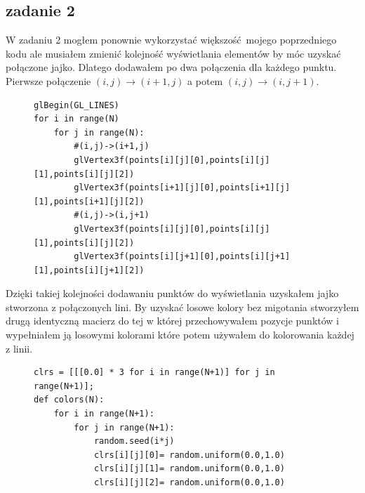 \documentclass[]{article}
\begin{document}
\subsection{zadanie 2}
W zadaniu 2 mogłem ponownie wykorzystać większość mojego poprzedniego kodu ale musiałem zmienić kolejność wyświetlania elementów by móc uzyskać połączone jajko. Dlatego dodawałem po dwa połączenia dla każdego punktu. Pierwsze połączenie $(i,j)\rightarrow (i+1,j)$ a potem $(i,j) \rightarrow (i,j+1)$.
\begin{figure}[H]
	\begin{verbatim}
glBegin(GL_LINES)
for i in range(N)
	for j in range(N):
		#(i,j)->(i+1,j)
		glVertex3f(points[i][j][0],points[i][j][1],points[i][j][2])
		glVertex3f(points[i+1][j][0],points[i+1][j][1],points[i+1][j][2])
		#(i,j)->(i,j+1)
		glVertex3f(points[i][j][0],points[i][j][1],points[i][j][2])
		glVertex3f(points[i][j+1][0],points[i][j+1][1],points[i][j+1][2])
	\end{verbatim}
\end{figure}
Dzięki takiej kolejności dodawaniu punktów do wyświetlania uzyskałem jajko stworzona z połączonych lini. By uzyskać losowe kolory bez migotania stworzyłem drugą identyczną macierz do tej w której przechowywałem pozycje punktów i wypełniałem ją losowymi kolorami które potem używałem do kolorowania każdej z linii.
\begin{figure}[H]
	\begin{verbatim}
clrs = [[[0.0] * 3 for i in range(N+1)] for j in range(N+1)];
def colors(N):
    for i in range(N+1):
        for j in range(N+1):
            random.seed(i*j)
            clrs[i][j][0]= random.uniform(0.0,1.0)
            clrs[i][j][1]= random.uniform(0.0,1.0)
            clrs[i][j][2]= random.uniform(0.0,1.0)
	\end{verbatim}
\end{figure}
\end{document}
